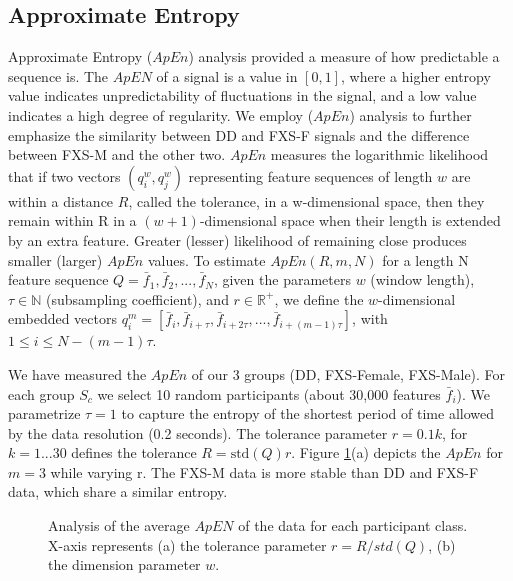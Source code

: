 \documentclass[10pt,twocolumn,letterpaper]{article}
\begin{document}
\subsection{Approximate Entropy} 
 Approximate Entropy ($ApEn$) analysis provided a measure of how predictable a sequence is. The $ApEN$ of a signal is a value in $[0,1]$, where a higher entropy value indicates unpredictability of fluctuations in the signal, and a low value indicates a high degree of regularity. We employ ($ApEn$) analysis \cite{Restrepo:2014gs,entrophy} to further emphasize the similarity between DD and FXS-F signals and the difference between FXS-M and the other two. $ApEn$ measures the logarithmic likelihood that if two vectors $(q^{w}_{i}, q^{w}_{j})$ representing feature sequences of length $w$ are within a distance $R$, called the tolerance, in a w-dimensional space, then they remain within R in a $(w + 1)$-dimensional space when their length is extended by an extra feature. Greater (lesser) likelihood of remaining close produces smaller (larger) $ApEn$ values. To estimate $ApEn(R, m, N)$ for a length N feature sequence $Q={\bar{f}_1, \bar{f}_2, . . . , \bar{f}_{N}}$, given the parameters $w$ (window length), $\tau \in \mathbb{N}$ (subsampling coefficient), and $r \in \mathbb{R}^+$, we define the $w$-dimensional embedded vectors $q^{m}_{i}=[\bar{f}_{i}, \bar{f}_{i+\tau}, \bar{f}_{i+2\tau}, . . . , \bar{f}_{i+(m-1)\tau}]$, with $1 \leq i \leq N-(m-1)\tau$. 

We have measured the $ApEn$ of our 3 groups (DD, FXS-Female, FXS-Male). For each group $S_c$ we select 10 random participants (about 30,000 features $\bar{f}_i$). %
We parametrize $\tau=1$ to capture the entropy of the shortest period of time allowed by the data resolution (0.2 seconds). The tolerance parameter $r=0.1k$, for $k=1...30$ defines the tolerance $R = \text{std}(Q)r$. Figure \ref{fig:entropy}(a) depicts the $ApEn$ for $m=3$ while varying r. The FXS-M data is more stable than DD and FXS-F data, which share a similar entropy. 
\begin{figure}
            \hfill
       
        \caption{Analysis of the average $ApEN$ of the data for each participant class. X-axis represents (a) the tolerance parameter $r = R/std(Q)$, (b) the dimension parameter $w$.}
         \label{fig:entropy}
\end{figure}
\end{document}
